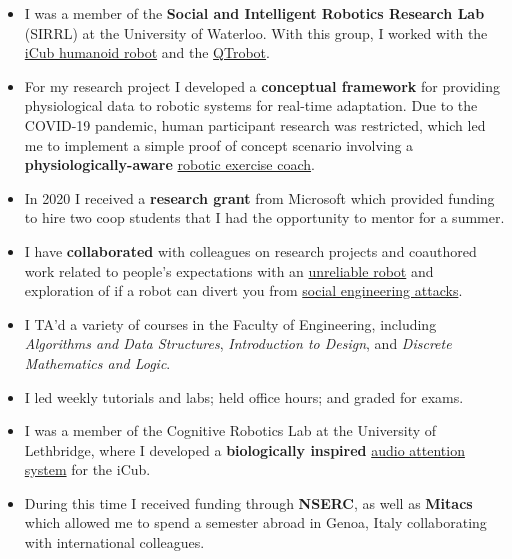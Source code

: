 \documentclass[10pt,a4paper,normalphoto]{altacv}
\begin{document}
\begin{paracol}{2}
\begin{itemize}
    \item I was a member of the \textbf{Social and Intelligent Robotics Research Lab} (SIRRL) at the University of Waterloo. With this group, I worked with the \href{https://icub-tech-iit.github.io/documentation/}{iCub humanoid robot} and the \href{https://robots.ieee.org/robots/qtrobot/}{QTrobot}.
    \item For my research project I developed a \textbf{conceptual framework} for providing physiological data to robotic systems for real-time adaptation. Due to the COVID-19 pandemic, human participant research was restricted, which led me to implement a simple proof of concept scenario involving a \textbf{physiologically-aware} \href{https://doi.org/10.1109/RO-MAN50785.2021.9515383}{robotic exercise coach}.
    \item In 2020 I received a \textbf{research grant} from Microsoft which provided funding to hire two coop students that I had the opportunity to mentor for a summer.
    \item I have \textbf{collaborated} with colleagues on research projects and coauthored work related to people's expectations with an \href{https://doi.org/10.1109/LRA.2021.3083465}{unreliable robot} and exploration of if a robot can divert you from \href{https://doi.org/10.1145/3623809.3623879}{social engineering attacks}.
\end{itemize}

\divider

\begin{itemize}
    \item I TA'd a variety of courses in the Faculty of Engineering, including \textit{Algorithms and Data Structures}, \textit{Introduction to Design}, and \textit{Discrete Mathematics and Logic}.
    \item I led weekly tutorials and labs; held office hours; and graded for exams.
\end{itemize}

\divider

\begin{itemize}
    \item I was a member of the Cognitive Robotics Lab at the University of Lethbridge, where I developed a \textbf{biologically inspired} \href{https://doi.org/10.1109/ROSE.2019.8790411}{audio attention system} for the iCub.
    \item During this time I received funding through \textbf{NSERC}, as well as \textbf{Mitacs} which allowed me to spend a semester abroad in Genoa, Italy collaborating with international colleagues.
\end{itemize}



\end{paracol}
\end{document}
